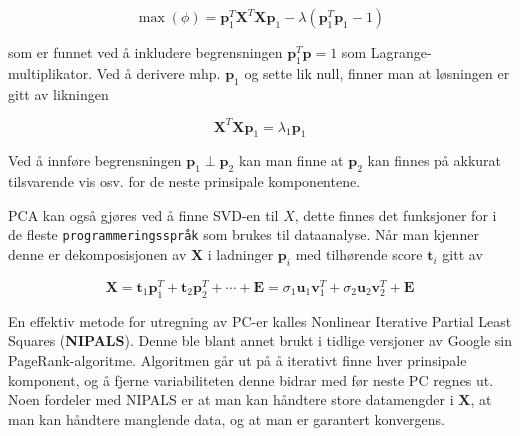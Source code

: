 \begin{equation}
	\max (\phi)=\boldsymbol{p}_{1}^{T} \boldsymbol{X}^{T} \boldsymbol{X} \boldsymbol{p}_{1}-\lambda\left(\boldsymbol{p}_{1}^{T} \boldsymbol{p}_{1}-1\right)
\end{equation}

som er funnet ved å inkludere begrensningen $\mathbf{p}_1^T \mathbf{p} = 1$ som Lagrange-multiplikator. Ved å derivere mhp. $\mathbf{p}_1$ og sette lik null, finner man at løsningen er gitt av likningen

\begin{equation}
	\mathbf{X}^T \mathbf{X} \mathbf{p}_1 = \lambda_1 \mathbf{p}_1
\end{equation}

Ved å innføre begrensningen $\mathbf{p}_1 \perp \mathbf{p}_2$ kan man finne at $\mathbf{p}_2$ kan finnes på akkurat tilsvarende vis osv. for de neste prinsipale komponentene.

PCA kan også gjøres ved å finne SVD-en til $X$, dette finnes det funksjoner for i de fleste \texttt{programmeringsspråk} som brukes til dataanalyse. Når man kjenner denne er dekomposisjonen av $\mathbf{X}$ i ladninger $\mathbf{p}_i$ med tilhørende score $\mathbf{t}_i$ gitt av

\begin{equation}
	\mathbf{X} = \mathbf{t}_1 \mathbf{p}_1^T + \mathbf{t}_2 \mathbf{p}_2^T + \cdots + \mathbf{E} = \sigma_1 \mathbf{u}_1 \mathbf{v}_1^T +  \sigma_2 \mathbf{u}_2 \mathbf{v}_2^T + \mathbf{E} 
\end{equation}

En effektiv metode for utregning av PC-er kalles Nonlinear Iterative Partial Least Squares (\textbf{NIPALS}). Denne ble blant annet brukt i tidlige versjoner av Google sin PageRank-algoritme. Algoritmen går ut på å iterativt finne hver prinsipale komponent, og å fjerne variabiliteten denne bidrar med før neste PC regnes ut. Noen fordeler med NIPALS er at man kan håndtere store datamengder i $\mathbf{X}$, at man kan håndtere manglende data, og at man er garantert konvergens.


